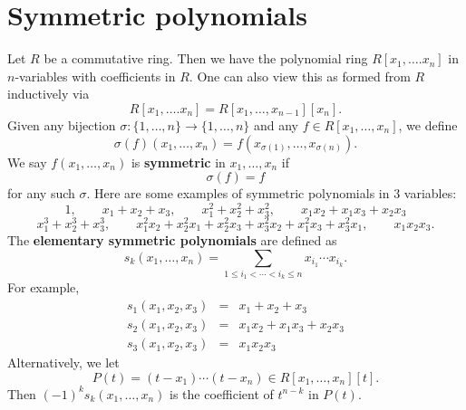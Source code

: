 \documentclass{article}
\begin{document}
\section{Symmetric polynomials}
Let $R$ be a commutative ring. Then we have the polynomial ring $R[x_1,\ldots.x_n]$ in $n$-variables with coefficients in $R$. One can also view this as formed from $R$ inductively via
$$R[x_1,\ldots.x_n] = R[x_1,\ldots,x_{n-1}][x_n].$$
Given any bijection $\sigma:\{1,\ldots,n\}\rightarrow\{1,\ldots,n\}$ and any $f\in R[x_1,\ldots,x_n]$, we define
$$\sigma(f)(x_1,\ldots,x_n) = f(x_{\sigma(1)},\ldots,x_{\sigma(n)}).$$
We say $f(x_1,\ldots,x_n)$ is \textbf{symmetric} in $x_1,\ldots,x_n$ if $$\sigma(f) = f$$ for any such $\sigma$. Here are some examples of symmetric polynomials in $3$ variables:
$$1, \qquad x_1 + x_2 + x_3, \qquad x_1^2 + x_2^2 + x_3^2, \qquad x_1x_2 + x_1x_3 + x_2x_3$$
$$x_1^3+x_2^3+x_3^3,\qquad x_1^2x_2 + x_2^2x_1 + x_2^2x_3 + x_3^2x_2 + x_1^2x_3 + x_3^2x_1,\qquad x_1x_2x_3.$$
The \textbf{elementary symmetric polynomials} are defined as 
$$s_k(x_1,\ldots,x_n) = \sum_{1\leq i_1 < \cdots < i_k \leq n}x_{i_1}\cdots x_{i_k}.$$
For example,
\begin{eqnarray*}
    s_1(x_1,x_2,x_3) &=& x_1 + x_2 + x_3\\
    s_2(x_1,x_2,x_3) &=& x_1x_2 + x_1x_3 + x_2x_3\\
    s_3(x_1,x_2,x_3) &=& x_1x_2x_3
\end{eqnarray*}
Alternatively, we let $$P(t) = (t - x_1)\cdots(t - x_n) \in R[x_1,\ldots,x_n][t].$$
Then $(-1)^ks_k(x_1,\ldots,x_n)$ is the coefficient of $t^{n-k}$ in $P(t)$.
\end{document}
